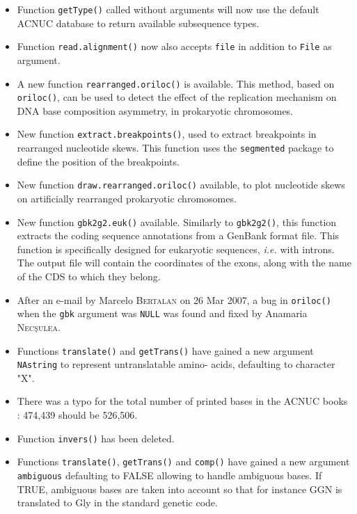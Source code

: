 \documentclass{article}
\begin{document}
\begin{itemize}
\item Function \texttt{getType()} called without arguments will now use
the default ACNUC database to return available subsequence types.

\item Function \texttt{read.alignment()} now also accepts \texttt{file} in
addition to \texttt{File} as argument.

\item A new function \texttt{rearranged.oriloc()} is available. This
method, based on \texttt{oriloc()}, can be used to detect the effect of
the replication mechanism on DNA base composition asymmetry, in
prokaryotic chromosomes.

\item New function \texttt{extract.breakpoints()}, used to extract
breakpoints in rearranged nucleotide skews. This function uses the
\texttt{segmented} package to define the position of the breakpoints.

\item New function \texttt{draw.rearranged.oriloc()} available, to plot
nucleotide skews on artificially rearranged prokaryotic chromosomes.

\item New function \texttt{gbk2g2.euk()} available. Similarly to 
\texttt{gbk2g2()}, this function extracts the coding sequence annotations
from a GenBank format file. This function is specifically designed for
eukaryotic sequences, \textit{i.e.} with introns. The output file will contain
the coordinates of the exons, along with the name of the CDS to which
they belong.

\item After an e-mail by Marcelo \textsc{Bertalan} on 26 Mar 2007, a bug in
\texttt{oriloc()} when the \texttt{gbk} argument was \texttt{NULL}
was found and fixed by Anamaria \textsc{Nec\c{s}ulea}.

\item Functions \texttt{translate()} and \texttt{getTrans()} have gained
a new argument \texttt{NAstring} to represent untranslatable amino-
acids, defaulting to character "X".

\item There was a typo for the total number of printed bases in
the ACNUC books \cite{GautierC1982a, GautierC1982b} : 474,439 should be 526,506.

\item Function \texttt{invers()} has been deleted.

\item Functions \texttt{translate()}, \texttt{getTrans()} and \texttt{comp()} have gained a 
new argument \texttt{ambiguous} defaulting to FALSE allowing to handle 
ambiguous bases. If TRUE, ambiguous bases are taken into account so that 
for instance GGN is translated to Gly in the standard genetic code.


\end{itemize}
\end{document}
